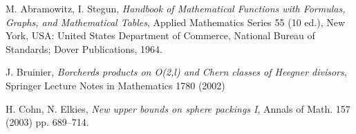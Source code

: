 \begin{thebibliography}{10}
 {\sc M. Abramowitz, I. Stegun}, \emph{ Handbook of Mathematical Functions with Formulas, Graphs, and Mathematical Tables}, Applied Mathematics Series 55 (10 ed.), New York, USA: United States Department of Commerce, National Bureau of Standards; Dover Publications, 1964.


 {\sc J. Bruinier}, \emph{Borcherds products on O(2,l) and Chern classes of Heegner divisors}, Springer Lecture Notes in Mathematics 1780 (2002)

  {\sc H. Cohn, N. Elkies}, \emph{New upper bounds on sphere packings I}, Annals of Math. 157 (2003) pp. 689--714.












\end{thebibliography}
